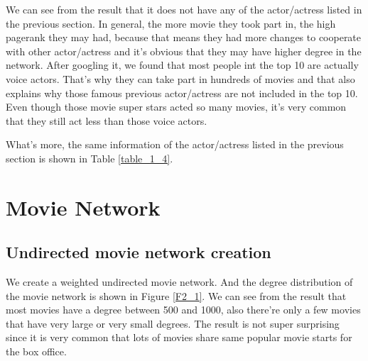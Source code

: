 \documentclass[11pt]{article}
\begin{document}
We can see from the result that it does not have any of the actor/actress listed in the previous section. In general, the more movie they took part in, the high pagerank they may had, because that means they had more changes to cooperate with other actor/actress and it's obvious that they may have higher degree in the network. After googling it, we found that most people int the top 10 are actually voice actors. That's why they can take part in hundreds of movies and that also explains why those famous previous actor/actress are not included in the top 10. Even though those movie super stars acted so many movies, it's very common that they still act less than those voice actors.

What's more, the same information of the actor/actress listed in the previous section is shown in Table \ref{table_1_4}.

\begin{table}[h]
\center
\caption{The same information table for previous actor/actress}
\label{table_1_4}
\end{table}

\section{Movie Network}

\subsection{Undirected movie network creation}
We create a weighted undirected movie network. And the degree distribution of the movie network is shown in Figure \ref{F2_1}. We can see from the result that most movies have a degree between 500 and 1000, also there're only a few movies that have very large or very small degrees. The result is not super surprising since it is very common that lots of movies share same popular movie starts for the box office.
\end{document}
